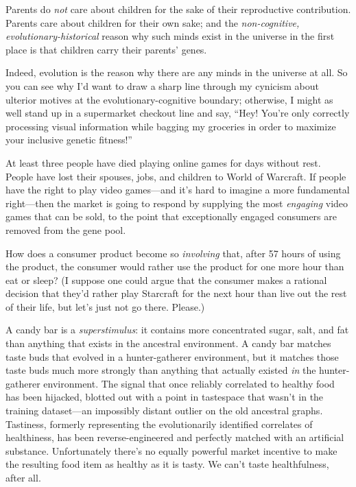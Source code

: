 {
 Parents do \textit{not} care about children for the sake of their
reproductive contribution. Parents care about children for their own
sake; and the \textit{non-cognitive, evolutionary-historical} reason
why such minds exist in the universe in the first place is that
children carry their parents' genes.}

{
 Indeed, evolution is the reason why there are any minds in the
universe at all. So you can see why I'd want to draw a
sharp line through my cynicism about ulterior motives at the
evolutionary-cognitive boundary; otherwise, I might as well stand up in
a supermarket checkout line and say, ``Hey!
You're only correctly processing visual information
while bagging my groceries in order to maximize your inclusive genetic
fitness!''}

\myendsectiontext


\bigskip


{
 At least three people have died playing online games for days
without rest. People have lost their spouses, jobs, and children to
World of Warcraft. If people have the right to play video games---and
it's hard to imagine a more fundamental right---then
the market is going to respond by supplying the most \textit{engaging}
video games that can be sold, to the point that exceptionally engaged
consumers are removed from the gene pool. }

{
 How does a consumer product become so \textit{involving} that,
after 57 hours of using the product, the consumer would rather use the
product for one more hour than eat or sleep? (I suppose one could argue
that the consumer makes a rational decision that they'd
rather play Starcraft for the next hour than live out the rest of their
life, but let's just not go there. Please.)}

{
 A candy bar is a \textit{superstimulus}: it contains more
concentrated sugar, salt, and fat than anything that exists in the
ancestral environment. A candy bar matches taste buds that evolved in a
hunter-gatherer environment, but it matches those taste buds much more
strongly than anything that actually existed \textit{in} the
hunter-gatherer environment. The signal that once reliably correlated
to healthy food has been hijacked, blotted out with a point in
tastespace that wasn't in the training dataset---an
impossibly distant outlier on the old ancestral graphs. Tastiness,
formerly representing the evolutionarily identified correlates of
healthiness, has been reverse-engineered and perfectly matched with an
artificial substance. Unfortunately there's no equally
powerful market incentive to make the resulting food item as healthy as
it is tasty. We can't taste healthfulness, after all.}

